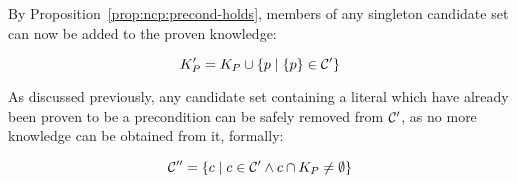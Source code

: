 \documentclass[\master/Master.tex]{subfiles}
\begin{document}
By Proposition~\ref{prop:ncp:precond-holds}, members of any singleton candidate set can now be added to the proven knowledge:

\begin{equation} \label{eq:extractKnown}
    K_P' = K_P \cup \left\{ p \; | \; \{ p \} \in \mathcal{C}' \right\}
\end{equation}

As discussed previously, any candidate set containing a literal which have already been proven to be a precondition can be safely removed from $\mathcal{C}'$, as no more knowledge can be obtained from it, formally:


\begin{equation} \label{eq:removeKnown}
    \mathcal{C}'' = \left\{ c \; | \; c \in \mathcal{C}' \land c \cap K_P \neq \emptyset \right\}
\end{equation}
\end{document}
